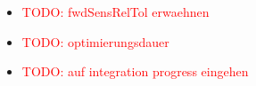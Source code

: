 \documentclass{scrartcl}[12pt, halfparskip]
\numberwithin{equation}{section}
\numberwithin{figure}{section}
\numberwithin{table}{section}
\newcommand{\todo}[1]{\textcolor{red}{TODO: #1}}
\begin{document}
\begin{itemize}
	\item \todo{fwdSensRelTol erwaehnen}
	\item \todo{optimierungsdauer}
	\item \todo{auf integration progress eingehen}
\end{itemize}




\end{document}

